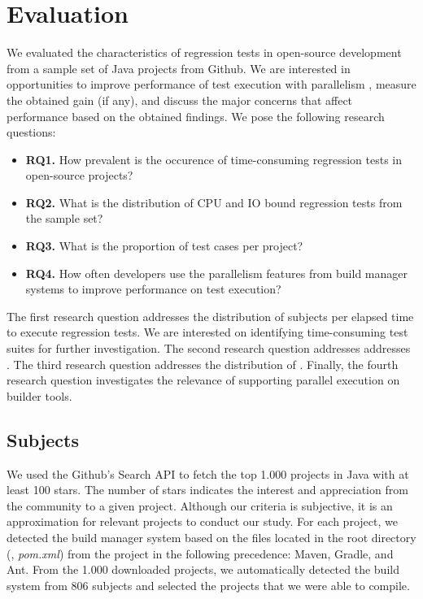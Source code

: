\section{Evaluation}
\label{sec:eval}

We evaluated the characteristics of regression tests in open-source
development from a sample set of Java projects from Github. We are
interested in opportunities to improve performance of test execution
with parallelism , measure the
obtained gain (if any), and discuss the major concerns that affect
performance based on the obtained findings.  We pose the following
research questions:

\newcommand{\RQONE}{How prevalent is the occurence of time-consuming
regression tests in open-source projects?}
\newcommand{\RQTWO}{What is the distribution of CPU and IO bound
regression tests from the sample set?}
\newcommand{\RQTHREE}{What is the proportion of \Fix{time-consuming?}
test cases per project?}
\newcommand{\RQFOUR}{How often developers use the parallelism features
from build manager systems to improve performance on test execution?}

\newcommand{\rqA}{\textbf{RQ1.} \RQONE}
\newcommand{\rqB}{\textbf{RQ2.} \RQTWO}
\newcommand{\rqC}{\textbf{RQ3.} \RQTHREE}
\newcommand{\rqD}{\textbf{RQ4.} \RQFOUR}

\begin{itemize}
    \item \rqA
    \item \rqB
    \item \rqC
    \item \rqD
\end{itemize}

The first research question addresses the distribution of subjects per
elapsed time to execute regression tests. We are interested on
identifying time-consuming test suites for further investigation. The
second research question addresses addresses . The third
research question addresses the distribution of . Finally,
the fourth research question investigates the relevance of supporting
parallel execution on builder tools.

\subsection{Subjects}
\label{sec:subjects}

We used the Github's Search API to fetch the top 1.000 projects in
Java with at least 100 stars. The number of stars indicates the
interest and appreciation from the community to a given project.
 Although our
criteria is subjective, it is an approximation for relevant projects
to conduct our study. For each project, we detected the build manager
system based on the files located in the root directory (\eg,
\emph{pom.xml}) from the project in the following precedence: Maven,
Gradle, and Ant. From the 1.000 downloaded projects, we automatically
detected the build system from 806 subjects and selected the 
projects that we were able to compile.

